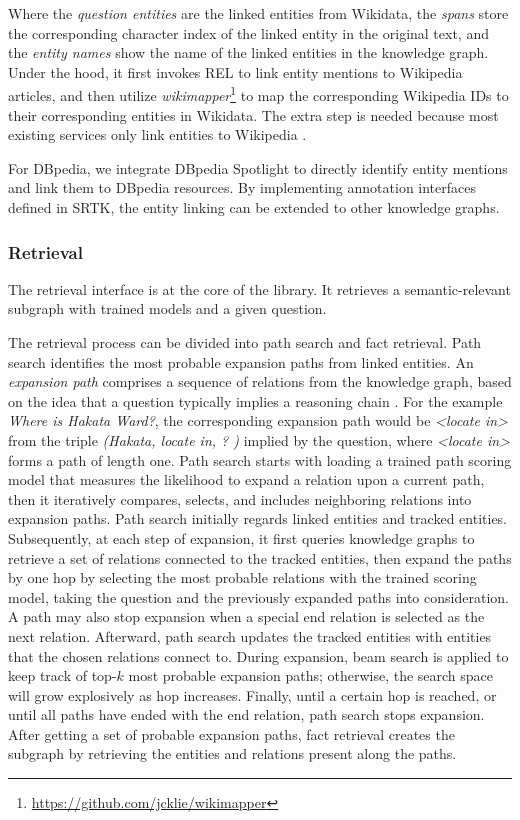 \documentclass[runningheads]{llncs}
\begin{document}
Where the \textit{question entities} are the linked entities from Wikidata, the \textit{spans} store the corresponding character index of the linked entity in the original text, and the \textit{entity names} show the name of the linked entities in the knowledge graph. Under the hood, it first invokes REL \cite{vanHulst2020REL} to link entity mentions to Wikipedia articles, and then utilize \textit{wikimapper}\footnote{\url{https://github.com/jcklie/wikimapper}} to map the corresponding Wikipedia IDs to their corresponding entities in Wikidata. The extra step is needed because most existing services only link entities to Wikipedia \cite{vanHulst2020REL,ferragina2011tagme,piccinno2014wat}. 

For DBpedia, we integrate DBpedia Spotlight \cite{mendes2011dbpediaspotlight} to directly identify entity mentions and link them to DBpedia resources. By implementing annotation interfaces defined in SRTK, the entity linking can be extended to other knowledge graphs. 

\subsubsection{Retrieval}

The retrieval interface is at the core of the library. It retrieves a semantic-relevant subgraph with trained models and a given question.

The retrieval process can be divided into path search and fact retrieval. Path search identifies the most probable expansion paths from linked entities. An \textit{expansion path} comprises a sequence of relations from the knowledge graph, based on the idea that a question typically implies a reasoning chain \cite{zhang2022ruckbqa}. For the example \textit{Where is Hakata Ward?}, the corresponding expansion path would be \textit{<locate in>} from the triple \textit{(Hakata, locate in, ? )} implied by the question, where \textit{<locate in>} forms a path of length one. Path search starts with loading a trained path scoring model that measures the likelihood to expand a relation upon a current path, then it iteratively compares, selects, and includes neighboring relations into expansion paths. Path search initially regards linked entities and tracked entities. Subsequently, at each step of expansion, it first queries knowledge graphs to retrieve a set of relations connected to the tracked entities, then expand the paths by one hop by selecting the most probable relations with the trained scoring model, taking the question and the previously expanded paths into consideration. A path may also stop expansion when a special end relation is selected as the next relation. Afterward, path search updates the tracked entities with entities that the chosen relations connect to. During expansion, beam search is applied to keep track of top-$k$ most probable expansion paths; otherwise, the search space will grow explosively as hop increases. Finally, until a certain hop is reached, or until all paths have ended with the end relation, path search stops expansion. After getting a set of probable expansion paths, fact retrieval creates the subgraph by retrieving the entities and relations present along the paths.
\end{document}
